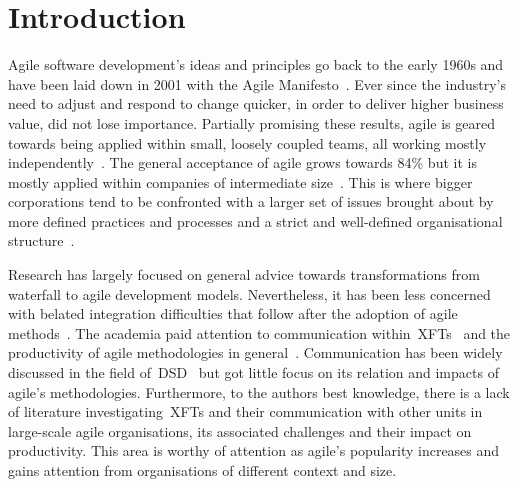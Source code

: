 \chapter{Introduction}

Agile software development's ideas and principles go back to the early 1960s and have been laid down in 2001 with the Agile Manifesto~\citep{beck2001agile}. Ever since the industry's need to adjust and respond to change quicker, in order to deliver higher business value, did not lose importance. Partially promising these results, agile is geared towards being applied within small, loosely coupled teams, all working mostly independently~\citep{stober2009agile}. The general acceptance of agile grows towards 84\% but it is mostly applied within companies of intermediate size~\citep{7thagilesur}. This is where bigger corporations tend to be confronted with a larger set of issues brought about by more defined practices and processes and a strict and well-defined organisational structure~\citep{schiel2009enterprise}. 

Research has largely focused on general advice towards transformations from waterfall to agile development models. Nevertheless, it has been less concerned with belated integration difficulties that follow after the adoption of agile methods~\citep{ivari2011orgagile}. The academia paid attention to communication within~\acp{XFT}~\citep{stray2012investigatingdailyteam, kauffeld2011meetingsmatter, pikkarainen2008impactagilecommunication} and the productivity of agile methodologies in general~\citep{badampudi2013proddelay, leffingwell2007scalelargecorps}. Communication has been widely discussed in the field of~\ac{DSD}~\citep{curtis1988fieldstudysoftwaredesign, kraut1995coordinationinsd, kraut1995coordinationinsd, rbs2012softwarearchitecture} but got little focus on its relation and impacts of agile's methodologies.
Furthermore, to the authors best knowledge, there is a lack of literature investigating~\acp{XFT} and their communication with other units in large-scale agile organisations, its associated challenges and their impact on productivity. This area is worthy of attention as agile's popularity increases and gains attention from organisations of different context and size.

